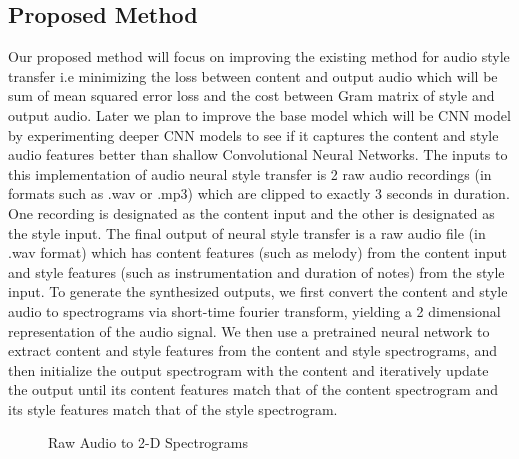\documentclass[10pt,twocolumn,letterpaper]{article}
\begin{document}
\subsection{Proposed Method}
Our proposed method will focus on improving the existing method for audio
style transfer i.e minimizing the loss between content
and output audio which will be sum of mean squared error
loss and the cost between Gram matrix of style and output
audio. Later we plan to improve the base model which will be CNN model by experimenting deeper CNN models to see if it captures the content and style audio features better than shallow Convolutional Neural Networks.
The inputs to this implementation of audio neural style transfer is 2 raw audio recordings (in formats such as .wav or .mp3) which are clipped to exactly 3 seconds in duration. One recording is designated as the content input and the other is designated as the style input. The final output of neural style transfer is a raw audio file (in .wav format) which has content features (such as melody)
from the content input and style features (such as instrumentation and duration of notes) from the
style input. 
To generate the synthesized outputs, we first convert the content and style audio to spectrograms via short-time fourier transform, yielding a 2 dimensional representation of the audio signal. We then use a pretrained neural network to extract content and style features from the content and style spectrograms, and then initialize the output spectrogram with the content and iteratively update the output until its content features match that of the content spectrogram and its style features match that of the style spectrogram.

\begin{figure}
\begin{center}
\end{center}
   \caption{Raw Audio to 2-D Spectrograms}
\label{fig:short}
\end{figure}
\end{document}
